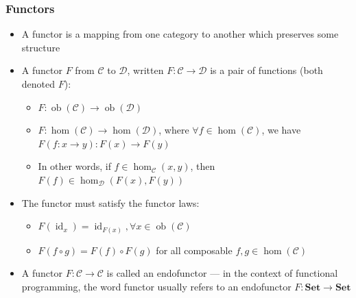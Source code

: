 \documentclass[mathserif,handout]{beamer}
\begin{document}
\begin{frame}[fragile]
  \frametitle{Functors}
  \begin{itemize}
  \item A \alert{functor} is a mapping from one category to another which preserves some structure
  \item A functor $F$ from $\mathcal{C}$ to $\mathcal{D}$, written $F: \mathcal{C}\longrightarrow\mathcal{D}$ is a pair of functions (both denoted $F$):
    \begin{itemize}
    \item $F: \operatorname{ob}(\mathcal{C}) \longrightarrow \operatorname{ob}(\mathcal{D})$
    \item $F: \operatorname{hom}(\mathcal{C})\longrightarrow\operatorname{hom}(\mathcal{D})$, where $\forall f\in\operatorname{hom}(\mathcal{C})$, we have $F(f: x\longrightarrow y): F(x)\longrightarrow F(y)$
      \item In other words, if $f\in\operatorname{hom}_{\mathcal{C}}(x,y)$, then $F(f)\in\operatorname{hom}_{\mathcal{D}}(F(x),F(y))$
    \end{itemize}
  \item The functor must satisfy the \alert{functor laws}:
      \begin{itemize}
      \item $F(\operatorname{id}_x) = \operatorname{id}_{F(x)},\forall x\in\operatorname{ob}(\mathcal{C})$
      \item $F(f\circ g) = F(f)\circ F(g)$ for all composable $f,g\in \operatorname{hom}(\mathcal{C})$
      \end{itemize}
      \item A functor $F:\mathcal{C}\longrightarrow\mathcal{C}$ is called an \alert{endofunctor} --- in the context of functional programming, the word functor usually refers to an endofunctor $F: \textbf{Set}\longrightarrow\textbf{Set}$
  \end{itemize}
\end{frame}
\end{document}
